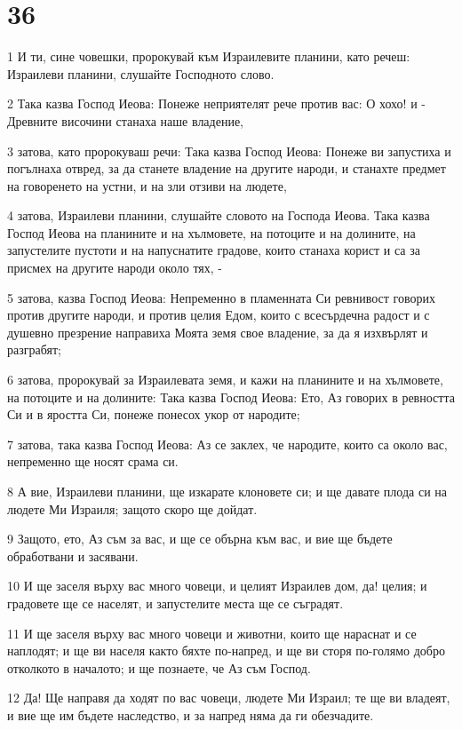 \chapter{36}

\par 1 И ти, сине човешки, пророкувай към Израилевите планини, като речеш: Израилеви планини, слушайте Господното слово.
\par 2 Така казва Господ Иеова: Понеже неприятелят рече против вас: О хохо! и - Древните височини станаха наше владение,
\par 3 затова, като пророкуваш речи: Така казва Господ Иеова: Понеже ви запустиха и погълнаха отвред, за да станете владение на другите народи, и станахте предмет на говоренето на устни, и на зли отзиви на людете,
\par 4 затова, Израилеви планини, слушайте словото на Господа Иеова. Така казва Господ Иеова на планините и на хълмовете, на потоците и на долините, на запустелите пустоти и на напуснатите градове, които станаха корист и са за присмех на другите народи около тях, -
\par 5 затова, казва Господ Иеова: Непременно в пламенната Си ревнивост говорих против другите народи, и против целия Едом, които с всесърдечна радост и с душевно презрение направиха Моята земя свое владение, за да я изхвърлят и разграбят;
\par 6 затова, пророкувай за Израилевата земя, и кажи на планините и на хълмовете, на потоците и на долините: Така казва Господ Иеова: Ето, Аз говорих в ревността Си и в яростта Си, понеже понесох укор от народите;
\par 7 затова, така казва Господ Иеова: Аз се заклех, че народите, които са около вас, непременно ще носят срама си.
\par 8 А вие, Израилеви планини, ще изкарате клоновете си; и ще давате плода си на людете Ми Израиля; защото скоро ще дойдат.
\par 9 Защото, ето, Аз съм за вас, и ще се обърна към вас, и вие ще бъдете обработвани и засявани.
\par 10 И ще заселя върху вас много човеци, и целият Израилев дом, да! целия; и градовете ще се населят, и запустелите места ще се съградят.
\par 11 И ще заселя върху вас много човеци и животни, които ще нараснат и се наплодят; и ще ви населя както бяхте по-напред, и ще ви сторя по-голямо добро отколкото в началото; и ще познаете, че Аз съм Господ.
\par 12 Да! Ще направя да ходят по вас човеци, людете Ми Израил; те ще ви владеят, и вие ще им бъдете наследство, и за напред няма да ги обезчадите.
